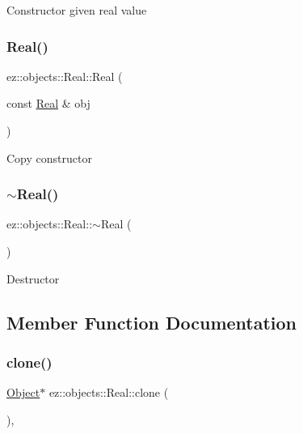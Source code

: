 Constructor given real value \mbox{\label{classez_1_1objects_1_1Real_a9c7aad24c40817f4f8417b625326390d}} 
\subsubsection{\texorpdfstring{Real()}{Real()}\hspace{0.1cm}{\footnotesize\ttfamily [4/4]}}
{\footnotesize\ttfamily ez\+::objects\+::\+Real\+::\+Real (\begin{DoxyParamCaption}\item[{const \hyperlink{classez_1_1objects_1_1Real}{Real} \&}]{obj }\end{DoxyParamCaption})\hspace{0.3cm}{\ttfamily [inline]}}

Copy constructor \mbox{\label{classez_1_1objects_1_1Real_abf8d708ad4242b393ca580cc330e925e}} 
\subsubsection{\texorpdfstring{$\sim$\+Real()}{~Real()}}
{\footnotesize\ttfamily ez\+::objects\+::\+Real\+::$\sim$\+Real (\begin{DoxyParamCaption}{ }\end{DoxyParamCaption})\hspace{0.3cm}{\ttfamily [inline]}}

Destructor 

\subsection{Member Function Documentation}
\mbox{\label{classez_1_1objects_1_1Real_a709e5a1bf422673b1b27d4d9d58de4b5}} 
\subsubsection{\texorpdfstring{clone()}{clone()}}
{\footnotesize\ttfamily \hyperlink{classez_1_1objects_1_1Object}{Object}$\ast$ ez\+::objects\+::\+Real\+::clone (\begin{DoxyParamCaption}{ }\end{DoxyParamCaption})\hspace{0.3cm}{\ttfamily [inline]}, {\ttfamily [virtual]}}

